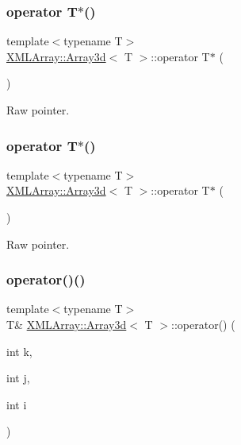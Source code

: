 \subsubsection{\texorpdfstring{operator T$\ast$()}{operator T*()}\hspace{0.1cm}{\footnotesize\ttfamily [1/2]}}
{\footnotesize\ttfamily template$<$typename T$>$ \\
\mbox{\hyperlink{classXMLArray_1_1Array3d}{X\+M\+L\+Array\+::\+Array3d}}$<$ T $>$\+::operator T$\ast$ (\begin{DoxyParamCaption}{ }\end{DoxyParamCaption})\hspace{0.3cm}{\ttfamily [inline]}}



Raw pointer. 

\mbox{\label{classXMLArray_1_1Array3d_aec4e2efc011195e91a742b7fa33bbbdb}} 
\subsubsection{\texorpdfstring{operator T$\ast$()}{operator T*()}\hspace{0.1cm}{\footnotesize\ttfamily [2/2]}}
{\footnotesize\ttfamily template$<$typename T$>$ \\
\mbox{\hyperlink{classXMLArray_1_1Array3d}{X\+M\+L\+Array\+::\+Array3d}}$<$ T $>$\+::operator T$\ast$ (\begin{DoxyParamCaption}{ }\end{DoxyParamCaption})\hspace{0.3cm}{\ttfamily [inline]}}



Raw pointer. 

\mbox{\label{classXMLArray_1_1Array3d_a2c17e47922ca191dbce50300c6dd6785}} 
\subsubsection{\texorpdfstring{operator()()}{operator()()}\hspace{0.1cm}{\footnotesize\ttfamily [1/4]}}
{\footnotesize\ttfamily template$<$typename T$>$ \\
T\& \mbox{\hyperlink{classXMLArray_1_1Array3d}{X\+M\+L\+Array\+::\+Array3d}}$<$ T $>$\+::operator() (\begin{DoxyParamCaption}\item[{int}]{k,  }\item[{int}]{j,  }\item[{int}]{i }\end{DoxyParamCaption})\hspace{0.3cm}{\ttfamily [inline]}}



